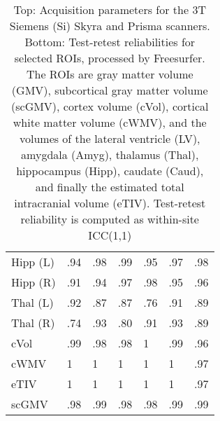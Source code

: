 \begin{table}
{\begin{tabular}{lllllll}
Hipp (L)              &                 .94 &                 .98 &               .99 &                .95 &                .97 &                .98 \\
Hipp (R)              &                 .91 &                 .94 &               .97 &                .98 &                .95 &                .96 \\
Thal (L)              &                 .92 &                 .87 &               .87 &                .76 &                .91 &                .89 \\
Thal (R)              &                 .74 &                 .93 &               .80 &                .91 &                .93 &                .89 \\
cVol                  &                 .99 &                 .98 &               .98 &                1   &                .99 &                .96 \\
cWMV                  &                 1   &                 1   &               1   &                1   &                1   &                .97 \\
eTIV                  &                 1   &                 1   &               1   &                1   &                1   &                .97 \\
scGMV                 &                 .98 &                 .99 &               .98 &                .98 &                .99 &                .99 \\
\bottomrule
\end{tabular}}
\fi
\caption{Top: Acquisition parameters for the 3T Siemens (Si) Skyra and Prisma scanners.  Bottom: Test-retest reliabilities for selected ROIs, processed by Freesurfer. The ROIs are gray matter volume (GMV), subcortical gray matter volume (scGMV), cortex volume (cVol), cortical white matter volume (cWMV), and the volumes of the lateral ventricle (LV), amygdala (Amyg), thalamus (Thal), hippocampus (Hipp), caudate (Caud), and finally the estimated total intracranial volume (eTIV). Test-retest reliability is computed as within-site ICC(1,1)} 
\label{tab:acquisition3}

\end{table}
